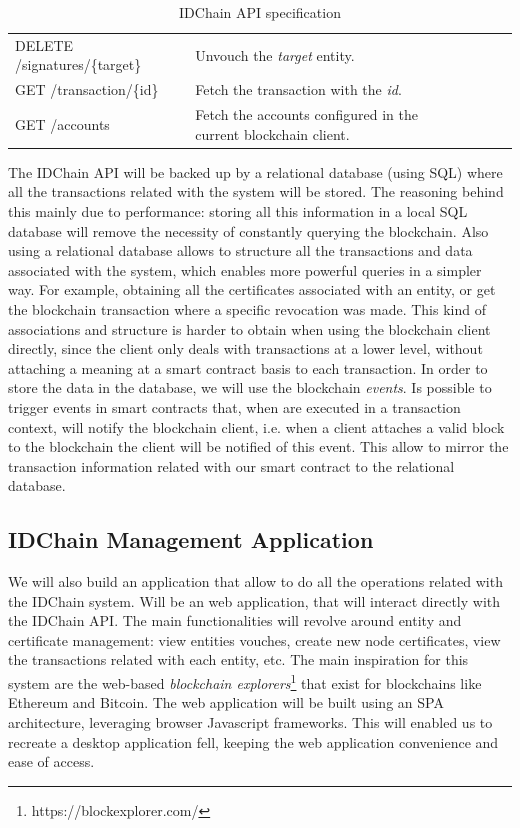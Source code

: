{\begin{table}[h]
\begin{tabular}{|l|l|lll}
    DELETE /signatures/\{target\}   & Unvouch the \textit{target} entity.                      &  &  &  \\ \cline{1-2}

    GET /transaction/\{id\}         & Fetch the transaction with the \textit{id}.                      &  &  &  \\ \cline{1-2}

    GET /accounts                   & Fetch the accounts configured in the current blockchain client.                        &  &  & \\ \cline{1-2}
  \end{tabular}%
  \caption{IDChain API specification}
\label{table:idchain-api-spec}
\end{table}

The IDChain API will be backed up by a relational database (using \ac{SQL}) where all the transactions related with the system will be stored.
The reasoning behind this mainly due to performance: storing all this information in a local \ac{SQL} database will remove the necessity of constantly querying the blockchain.
Also using a relational database allows to structure all the transactions and data associated with the system, which enables more powerful queries in a simpler way.
For example, obtaining all the certificates associated with an entity, or get the blockchain transaction where a specific revocation was made.
This kind of associations and structure is harder to obtain when using the blockchain client directly, since the client only deals with transactions at a lower level, without attaching a meaning at a smart contract basis to each transaction.
In order to store the data in the database, we will use the blockchain \textit{events}.
Is possible to trigger events in smart contracts that, when are executed in a transaction context, will notify the blockchain client, i.e. when a client attaches a valid block to the blockchain the client will be notified of this event.
This allow to mirror the transaction information related with our smart contract to the relational database.

\subsection{IDChain Management Application}
\label{subsection:idchain-app}

We will also build an application that allow to do all the operations related with the IDChain system.
Will be an web application, that will interact directly with the IDChain API.
The main functionalities will revolve around entity and certificate management: view entities vouches, create new node certificates, view the transactions related with each entity, etc.
The main inspiration for this system are the web-based \textit{blockchain explorers}\footnote{https://blockexplorer.com/} that exist for blockchains like Ethereum and Bitcoin.
The web application will be built using an \ac{SPA} architecture, leveraging browser Javascript frameworks.
This will enabled us to recreate a desktop application fell, keeping the web application convenience and ease of access.

}
